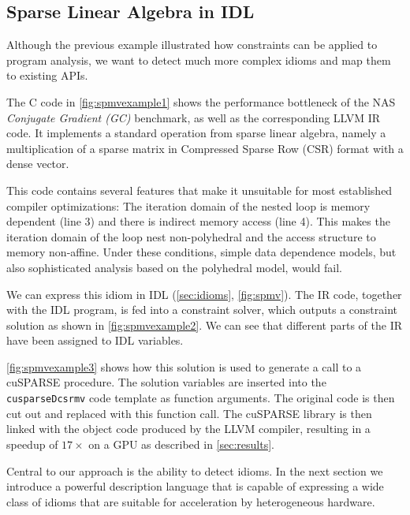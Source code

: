\begin{figure}[p]
    
\end{figure}

\subsection{Sparse Linear Algebra in IDL}

    Although the previous example illustrated how constraints can be applied to 
    program analysis, we want to detect much more complex idioms and 
    map them to existing APIs.

    The C code in \autoref{fig:spmvexample1} shows the performance bottleneck of
    the NAS \emph{Conjugate Gradient (GC)} benchmark, as well as the
    corresponding LLVM IR code.
    It implements a standard operation from sparse linear algebra, namely a
    multiplication of a sparse matrix in Compressed Sparse Row (CSR) format with
    a dense vector.

    This code contains several features that make it unsuitable for most
    established compiler optimizations:
    The iteration domain of the nested loop is memory dependent (line 3) and
    there is indirect memory access (line 4).
    This makes the iteration domain of the loop nest non-polyhedral and the
    access structure to memory non-affine.
    Under these conditions, simple data dependence models, but also
    sophisticated analysis based on the polyhedral model, would fail.

    We can express this idiom in IDL (\autoref{sec:idioms}, \autoref{fig:spmv}).
    The IR code, together with the IDL program, is fed into a constraint solver,
    which outputs a constraint solution as shown in \autoref{fig:spmvexample2}.
    We can see that different parts of the IR have been assigned to IDL
    variables.

    \autoref{fig:spmvexample3} shows how this solution is used to generate a
    call to a cuSPARSE procedure.
    The solution variables are inserted into the {\tt cusparseDcsrmv} code
    template as function arguments. 
    The original code is then cut out and replaced with this function call.
    The cuSPARSE library is then linked with the object code produced by the
    LLVM compiler, resulting in a speedup of $17\times$ on a GPU as described in
    \autoref{sec:results}.

    Central to our approach is the ability to detect idioms.
    In the next section we introduce a powerful description language that is
    capable of expressing a wide class of idioms that are suitable for
    acceleration by heterogeneous hardware.


